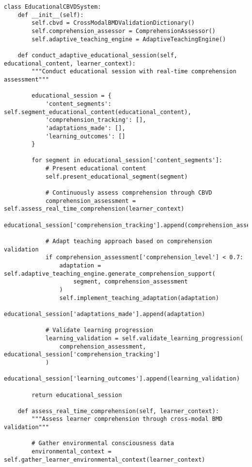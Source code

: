 \documentclass[12pt,a4paper]{article}
\begin{document}
\begin{lstlisting}[style=pythonstyle, caption=Educational CBVD Application]
class EducationalCBVDSystem:
    def __init__(self):
        self.cbvd = CrossModalBMDValidationDictionary()
        self.comprehension_assessor = ComprehensionAssessor()
        self.adaptive_teaching_engine = AdaptiveTeachingEngine()
        
    def conduct_adaptive_educational_session(self, educational_content, learner_context):
        """Conduct educational session with real-time comprehension assessment"""
        
        educational_session = {
            'content_segments': self.segment_educational_content(educational_content),
            'comprehension_tracking': [],
            'adaptations_made': [],
            'learning_outcomes': []
        }
        
        for segment in educational_session['content_segments']:
            # Present educational content
            self.present_educational_segment(segment)
            
            # Continuously assess comprehension through CBVD
            comprehension_assessment = self.assess_real_time_comprehension(learner_context)
            educational_session['comprehension_tracking'].append(comprehension_assessment)
            
            # Adapt teaching approach based on comprehension validation
            if comprehension_assessment['comprehension_level'] < 0.7:
                adaptation = self.adaptive_teaching_engine.generate_comprehension_support(
                    segment, comprehension_assessment
                )
                self.implement_teaching_adaptation(adaptation)
                educational_session['adaptations_made'].append(adaptation)
            
            # Validate learning progression
            learning_validation = self.validate_learning_progression(
                comprehension_assessment, educational_session['comprehension_tracking']
            )
            educational_session['learning_outcomes'].append(learning_validation)
        
        return educational_session
    
    def assess_real_time_comprehension(self, learner_context):
        """Assess learner comprehension through cross-modal BMD validation"""
        
        # Gather environmental consciousness data
        environmental_context = self.gather_learner_environmental_context(learner_context)
        

\end{lstlisting}
\end{document}
